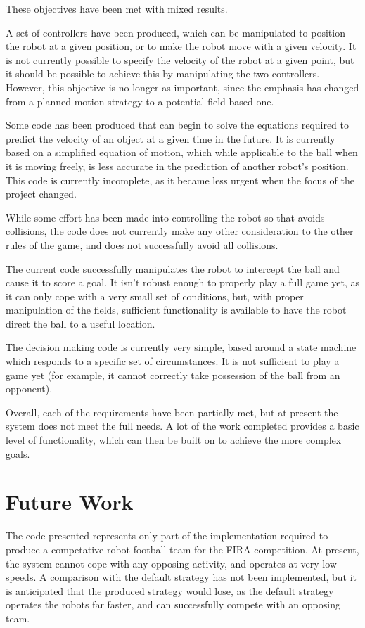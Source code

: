 \documentclass[10pt]{article}
\begin{document}
\cite{pplr}

These objectives have been met with mixed results.

A set of controllers have been produced, which can be manipulated to position
the robot at a given position, or to make the robot move with a given velocity. 
It is not currently possible to specify the velocity of the robot at a given
point, but it should be possible to achieve this by manipulating the two
controllers.  However, this objective is no longer as important, since the
emphasis has changed from a planned motion strategy to a potential field based
one.

Some code has been produced that can begin to solve the equations required to
predict the velocity of an object at a given time in the future.  It is
currently based on a simplified equation of motion, which while applicable to
the ball when it is moving freely, is less accurate in the prediction of another
robot's position.  This code is currently incomplete, as it became less urgent
when the focus of the project changed.

While some effort has been made into controlling the robot so that avoids
collisions, the code does not currently make any other consideration to the
other rules of the game, and does not successfully avoid all collisions.

The current code successfully manipulates the robot to intercept the ball and
cause it to score a goal.  It isn't robust enough to properly play a full game
yet, as it can only cope with a very small set of conditions, but, with proper
manipulation of the fields, sufficient functionality is available to have the
robot direct the ball to a useful location.

The decision making code is currently very simple, based around a state machine
which responds to a specific set of circumstances.  It is not sufficient to play
a game yet (for example, it cannot correctly take possession of the ball from
an opponent).

Overall, each of the requirements have been partially met, but at present the
system does not meet the full needs.  A lot of the work completed provides a
basic level of functionality, which can then be built on to achieve the more
complex goals.

\section{Future Work}

The code presented represents only part of the implementation required to
produce a competative robot football team for the FIRA competition.  At
present, the system cannot cope with any opposing activity, and operates at very
low speeds.  A comparison with the default strategy has not been implemented,
but it is anticipated that the produced strategy would lose, as the default
strategy operates the robots far faster, and can successfully compete with an
opposing team.
\end{document}
